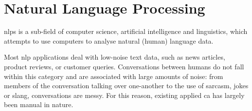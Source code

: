 \section{Natural Language Processing \label{sec: nlp}}

\Glspl{nlp} is a sub-field of computer science, artificial intelligence and linguistics, which attempts to use computers to analyse natural (human) language data.


Most \gls{nlp} applications deal with low-noise text data, such as news articles\cite{mediaBias}, product reviews\cite{productReviews}, or customer queries\cite{queryClassification}. Conversations between humans do not fall within this category and are associated with large amounts of noise: from members of the conversation talking over one-another to the use of sarcasm, jokes or slang, conversations are messy. For this reason, existing applied \gls{ca} has largely been manual in nature\cite{daApplications, ap_psychological, ap_trump, ap_interview}.
